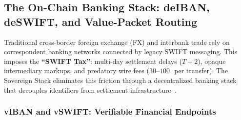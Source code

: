 \documentclass[a4paper,11pt,twoside,parskip=half-,headings=small]{scrartcl}
\newcommand{\EUR}[1]{\texteuro\,#1}
\begin{document}
\subsection{The On-Chain Banking Stack: deIBAN, deSWIFT, and Value-Packet Routing}
\label{sec:zkviban_kyc}

Traditional cross-border foreign exchange (FX) and interbank trade rely on correspondent banking networks connected by legacy SWIFT messaging. This imposes the \textbf{``SWIFT Tax''}: multi-day settlement delays ($T+2$), opaque intermediary markups, and predatory wire fees ($30$--$100$\,\EUR{} per transfer). The Sovereign Stack eliminates this friction through a decentralized banking stack that decouples identifiers from settlement infrastructure~\cite{blum2024lightbook,blum2024vision}.

\subsubsection{vIBAN and vSWIFT: Verifiable Financial Endpoints}
\end{document}
